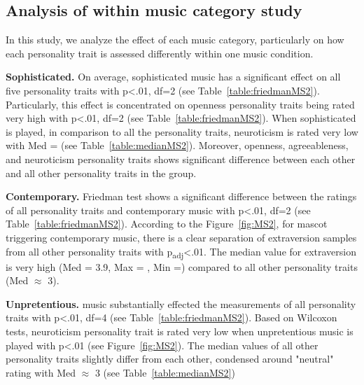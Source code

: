 \subsection{Analysis of within music category study}
\label{subsec:MSstudy2}
In this study, we analyze the effect of each music category, particularly on how each personality
trait is assessed differently within one music condition.

\par\textbf{Sophisticated.}
On average, sophisticated music has a significant effect on all five personality traits with
p<.01, df=2 (see Table~\ref{table:friedmanMS2}).
Particularly, this effect is concentrated on openness personality traits being rated
very high with p<.01, df=2 (see Table~\ref{table:friedmanMS2}).
When sophisticated is played, in comparison to all the personality traits, neuroticism
is rated very low with Med = (see Table~\ref{table:medianMS2}).
Moreover, openness, agreeableness, and neuroticism personality traits shows
significant difference between each other and all other personality traits in the group.

\par\textbf{Contemporary.}
Friedman test shows a significant difference between the ratings of all personality traits and
contemporary music with p<.01, df=2 (see Table~\ref{table:friedmanMS2}).
According to the Figure~\ref{fig:MS2}, for mascot triggering contemporary music, there is a clear
separation of extraversion samples from all other personality traits with p\textsubscript{adj}<.01.
The median value for extraversion is very high (Med = 3.9, Max = , Min =) compared to all
other personality traits (Med $\approx$ 3).

\par\textbf{Unpretentious.}
music substantially effected the measurements of all personality traits with
p<.01, df=4 (see Table~\ref{table:friedmanMS2}).
Based on Wilcoxon tests, neuroticism personality trait is rated very low when unpretentious music
is played with p<.01 (see Figure~\ref{fig:MS2}).
The median values of all other personality traits slightly differ from each other,
condensed around "neutral" rating with Med $\approx$ 3 (see Table~\ref{table:medianMS2})

